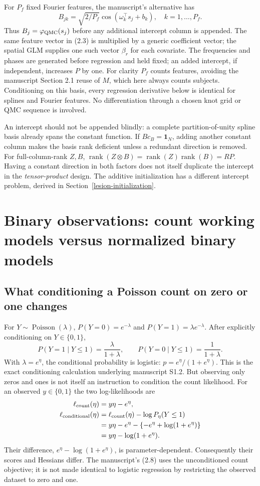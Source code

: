 \documentclass[11pt,a4paper]{article}
\numberwithin{equation}{section}
\begin{document}
For $P_f$ fixed Fourier features, the manuscript's alternative has
\[
 B_{jk}=\sqrt{2/P_f}\cos(\omega_k^\top s_j+b_k),\quad k=1,\ldots,P_f.
\]
Thus $B_j=\varphi_{\rm QMC}(s_j)$ before any additional intercept
column is appended. The same feature vector in (2.3) is multiplied
by a generic coefficient vector; the spatial GLM supplies one such
vector $\beta_r$ for each covariate.
The frequencies and phases are generated before regression and held
fixed; an added intercept, if independent, increases $P$ by one.
For clarity $P_f$ counts features, avoiding the manuscript Section 2.1
reuse of $M$, which here always counts subjects.
Conditioning on this basis, every regression derivative below is
identical for splines and Fourier features.
No differentiation through a chosen knot grid or QMC sequence is involved.

An intercept should not be appended blindly: a complete partition-of-unity
spline basis already spans the constant function.
If $Bc_B=\mathbf1_N$, adding another constant column makes the basis
rank deficient unless a redundant direction is removed.
For full-column-rank $Z,B$,
$\operatorname{rank}(Z\otimes B)=\operatorname{rank}(Z)\operatorname{rank}(B)=RP$.
Having a constant direction in both factors does not itself duplicate
the intercept in the \emph{tensor-product} design.
The additive initialization has a different intercept problem,
derived in Section~\ref{lesion-initialization}.

\section{Binary observations: count working models versus normalized binary models}
\label{lesion-binary}

\subsection{What conditioning a Poisson count on zero or one changes}
For $Y\sim\operatorname{Poisson}(\lambda)$,
$P(Y=0)=e^{-\lambda}$ and $P(Y=1)=\lambda e^{-\lambda}$.
After explicitly conditioning on $Y\in\{0,1\}$,
\[
 P(Y=1\mid Y\le1)=\frac{\lambda}{1+\lambda},\qquad
 P(Y=0\mid Y\le1)=\frac1{1+\lambda}.
\]
With $\lambda=e^\eta$, the conditional probability is logistic:
$p=e^\eta/(1+e^\eta)$. This is the exact conditioning calculation
underlying manuscript S1.2.
But observing only zeros and ones is not itself an instruction to
condition the count likelihood.
For an observed $y\in\{0,1\}$ the two log-likelihoods are
\begin{align}
 \ell_{\rm count}(\eta)&=y\eta-e^\eta,\\
 \ell_{\rm conditional}(\eta)
 &=\ell_{\rm count}(\eta)
     -\log P_\eta(Y\le1)\\
 &=y\eta-e^\eta-\{-e^\eta+\log(1+e^\eta)\}\\
 &=y\eta-\log(1+e^\eta).
 \label{lesion-conditioned-poisson}
\end{align}
Their difference, $e^\eta-\log(1+e^\eta)$, is parameter-dependent.
Consequently their scores and Hessians differ.
The manuscript's (2.8) uses the unconditioned count objective;
it is not made identical to logistic regression by restricting
the observed dataset to zero and one.
\end{document}
